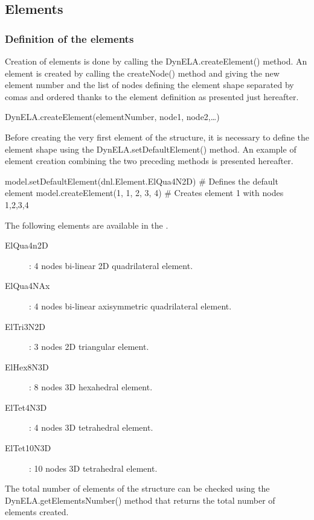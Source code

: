 \subsection{Elements}

\subsubsection{Definition of the elements}

Creation of elements is done by calling the \textsf{DynELA.createElement()} method. An element is created by calling the \textsf{createNode()} method and giving the new element number and the list of nodes defining the element shape separated by comas and ordered thanks to the element definition as presented just hereafter.

\textsf{DynELA.createElement(elementNumber, node1, node2,\ldots)}

Before creating the very first element of the structure, it is necessary to define the element shape using the \textsf{DynELA.setDefaultElement()} method. An example of element creation combining the two preceding methods is presented hereafter.

\begin{PythonListing}
model.setDefaultElement(dnl.Element.ElQua4N2D) # Defines the default element
model.createElement(1, 1, 2, 3, 4)             # Creates element 1 with nodes 1,2,3,4
\end{PythonListing}

The following elements are available in the \DynELA.
\begin{description}
\item [ElQua4n2D]: 4 nodes bi-linear 2D quadrilateral element.
\item [ElQua4NAx]: 4 nodes bi-linear axisymmetric quadrilateral element.
\item [ElTri3N2D]: 3 nodes 2D triangular element.
\item [ElHex8N3D]: 8 nodes 3D hexahedral element.
\item [ElTet4N3D]: 4 nodes 3D tetrahedral element.
\item [ElTet10N3D]: 10 nodes 3D tetrahedral element.
\end{description}
The total number of elements of the structure can be checked using the \textsf{DynELA.getElementsNumber()} method that returns the total number of elements created.

